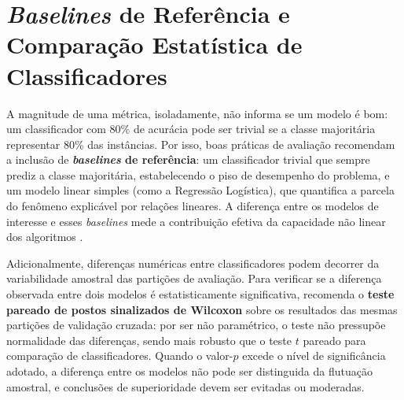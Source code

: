 \section{\textit{Baselines} de Referência e Comparação Estatística de Classificadores}

A magnitude de uma métrica, isoladamente, não informa se um modelo é bom: um classificador com 80\% de acurácia pode ser trivial se a classe majoritária representar 80\% das instâncias. Por isso, boas práticas de avaliação recomendam a inclusão de \textbf{\textit{baselines} de referência}: um classificador trivial que sempre prediz a classe majoritária, estabelecendo o piso de desempenho do problema, e um modelo linear simples (como a Regressão Logística), que quantifica a parcela do fenômeno explicável por relações lineares. A diferença entre os modelos de interesse e esses \textit{baselines} mede a contribuição efetiva da capacidade não linear dos algoritmos \cite{geron2019}.

Adicionalmente, diferenças numéricas entre classificadores podem decorrer da variabilidade amostral das partições de avaliação. Para verificar se a diferença observada entre dois modelos é estatisticamente significativa,  recomenda o \textbf{teste pareado de postos sinalizados de Wilcoxon} sobre os resultados das mesmas partições de validação cruzada: por ser não paramétrico, o teste não pressupõe normalidade das diferenças, sendo mais robusto que o teste $t$ pareado para comparação de classificadores. Quando o valor-$p$ excede o nível de significância adotado, a diferença entre os modelos não pode ser distinguida da flutuação amostral, e conclusões de superioridade devem ser evitadas ou moderadas.
